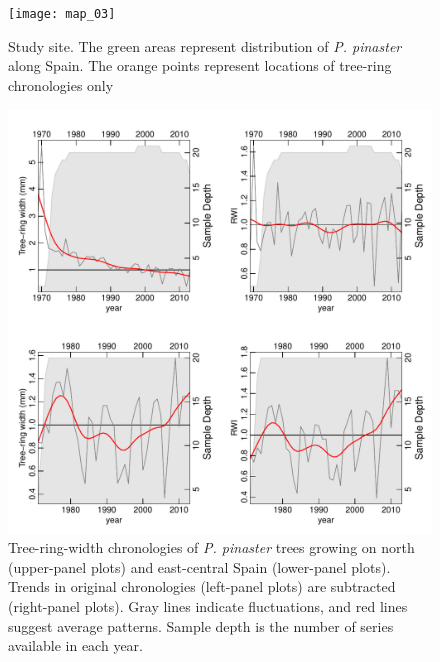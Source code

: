 \documentclass[review,authoryear]{elsarticle}
\begin{document}
\section{\refname}



\clearpage
\begin{figure}\centering
\texttt{[image: map\_03]} 
\caption{Study site. The green areas represent distribution of
  \textit{P. pinaster} along Spain. The orange points represent
  locations of tree-ring chronologies only}
\label{fig:map_03} 
\end{figure}

\clearpage
\begin{figure}\centering
\includegraphics[scale=0.7,trim=20mm 0mm 20mm 0mm]{RWIs} 
\caption{Tree-ring-width chronologies of \textit{P. pinaster} trees
  growing on north (upper-panel plots) and east-central Spain
  (lower-panel plots). Trends in original chronologies (left-panel
  plots) are subtracted (right-panel plots). Gray lines indicate
  fluctuations, and red lines suggest average patterns. Sample depth
  is the number of series available in each year.}
\label{fig:RWIs} 
\end{figure}
\end{document}
